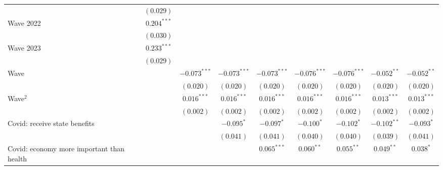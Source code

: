 \documentclass[
  10pt]{article}
\begin{document}
\begin{table}
{\begin{center}
{\begin{tabular}{l c c c c c c c c}
                                            & $(0.029)$      &                &                &                &                &                &                &                \\
\quad Wave 2022                             & $0.204^{***}$  &                &                &                &                &                &                &                \\
                                            & $(0.030)$      &                &                &                &                &                &                &                \\
\quad Wave 2023                             & $0.233^{***}$  &                &                &                &                &                &                &                \\
                                            & $(0.029)$      &                &                &                &                &                &                &                \\
Wave                                        &                & $-0.073^{***}$ & $-0.073^{***}$ & $-0.073^{***}$ & $-0.076^{***}$ & $-0.076^{***}$ & $-0.052^{**}$  & $-0.052^{**}$  \\
                                            &                & $(0.020)$      & $(0.020)$      & $(0.020)$      & $(0.020)$      & $(0.020)$      & $(0.020)$      & $(0.020)$      \\
Wave$^2$                                    &                & $0.016^{***}$  & $0.016^{***}$  & $0.016^{***}$  & $0.016^{***}$  & $0.016^{***}$  & $0.013^{***}$  & $0.013^{***}$  \\
                                            &                & $(0.002)$      & $(0.002)$      & $(0.002)$      & $(0.002)$      & $(0.002)$      & $(0.002)$      & $(0.002)$      \\
Covid: receive state benefits               &                &                & $-0.095^{*}$   & $-0.097^{*}$   & $-0.100^{*}$   & $-0.102^{*}$   & $-0.102^{**}$  & $-0.093^{*}$   \\
                                            &                &                & $(0.041)$      & $(0.041)$      & $(0.040)$      & $(0.040)$      & $(0.039)$      & $(0.041)$      \\
Covid: economy more important than health   &                &                &                & $0.065^{***}$  & $0.060^{**}$   & $0.055^{**}$   & $0.049^{**}$   & $0.038^{*}$    \\

\end{tabular}}
\end{center}}
\end{table}
\end{document}
